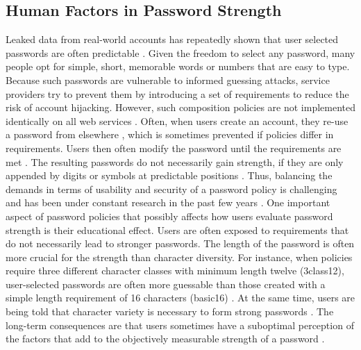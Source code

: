 \subsection{Human Factors in Password Strength}
Leaked data from real-world accounts has repeatedly shown that user selected passwords are often predictable \cite{Bonneau2012ScienceOfGuessing}. Given the freedom to select any password, many people opt for simple, short, memorable words or numbers that are easy to type. Because such passwords are vulnerable to informed guessing attacks, service providers try to prevent them by introducing a set of requirements to reduce the risk of account hijacking. However, such composition policies are not implemented identically on all web services \cite{Wang2015EmperorsPolicies}. Often, when users create an account, they re-use a password from elsewhere \cite{Das2014TangledWeb}, which is sometimes prevented if policies differ in requirements. Users then often modify the password until the requirements are met \cite{Inglesant2010TrueCostOfUnusablePolicies,Komanduri2011OfPasswordsAndPeople}. The resulting passwords do not necessarily gain strength, if they are only appended by digits or symbols at predictable positions \cite{Weir2010MetricsPolicies}. Thus, balancing the demands in terms of usability and security of a password policy is challenging and has been under constant research in the past few years \cite{Melicher2016UsabilityMobileTextPasswords,
	Shay2016DesigningPasswordPolicies, 
	Shay2014CanLongPasswordsBeSecureAndUsable,
	Wang2015EmperorsPolicies}. One important aspect of password policies that possibly affects how users evaluate password strength is their educational effect. Users are often exposed to requirements that do not necessarily lead to stronger passwords. The length of the password is often more crucial for the strength than character diversity. For instance, when policies require three different character classes with minimum length twelve (3class12), user-selected passwords are often more guessable than those created with a simple length requirement of 16 characters (basic16) \cite{Shay2014CanLongPasswordsBeSecureAndUsable}. At the same time, users are being told that character variety is necessary to form strong passwords \cite{Ur2012HowDoesYourPasswordMeasureUp}. The long-term consequences are that users sometimes have a suboptimal perception of the factors that add to the objectively measurable strength of a password \cite{Ur2016PerceptionsPassword}. %



